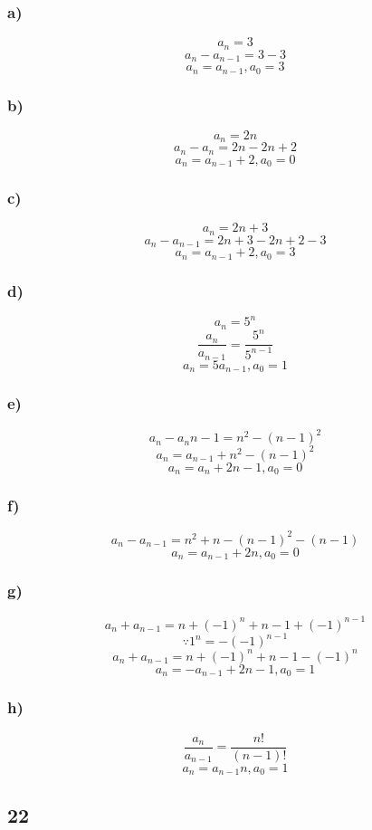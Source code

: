 \documentclass[journal]{IEEEtran}
\begin{document}
\subsubsection*{a)}
$$a_n= 3$$
$$a_n - a_{n-1} = 3 - 3$$
$$\boxed{a_n = a_{n-1}, a_0 = 3}$$

\subsubsection*{b)}
$$a_n = 2n$$
$$a_n - a_n = 2n - 2n + 2 $$
$$\boxed{a_n = a_{n-1}+2, a_0 = 0}$$

\subsubsection*{c)}
$$a_n = 2n+3$$
$$a_n - a_{n-1} = 2n+3 - 2n +2 - 3$$
$$\boxed{a_n = a_{n-1}+2, a_0 = 3}$$

\subsubsection*{d)}
$$a_n = 5^n$$
$$\frac{a_n}{a_{n-1}} = \frac{5^n}{5^{n-1}}$$
$$\boxed{a_n = 5a_{n-1}, a_0 = 1}$$

\subsubsection*{e)}
$$a_n - a_n{n-1} = n^2 - (n-1)^2$$
$$a_n = a_{n-1} +n^2 - (n-1)^2$$
$$\boxed{a_n = a_n +2n - 1, a_0 = 0}$$

\subsubsection*{f)}
$$a_n - a_{n-1} = n^2 + n - (n-1)^2 - (n-1)$$
$$\boxed{a_n = a_{n-1} +2n, a_0 = 0}$$

\subsubsection*{g)}
$$a_n + a_{n-1}= n+ (-1)^n + n - 1 +(-1)^{n-1}$$
$$\because 1^n = -(-1)^{n-1}$$
$$a_n + a_{n-1}= n + (-1)^n + n - 1 -(-1)^{n}$$
$$\boxed{a_n = -a_{n-1} +2n- 1, a_0 = 1}$$

\subsubsection*{h)}
$$\frac{a_n}{a_{n-1}} = \frac{n!}{(n-1)!}$$
$$\boxed{a_n = a_{n-1}n, a_0 = 1}$$

\subsection*{22}
\end{document}

